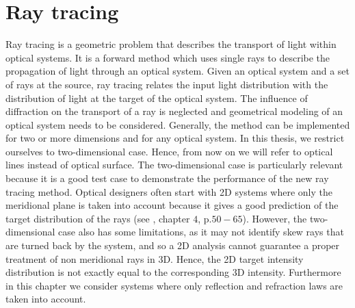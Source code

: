 \chapter{Ray tracing}\label{chap:raytracing}
Ray tracing is a geometric problem that describes the transport of light within optical systems.
It is a forward method which uses single rays to describe the propagation of light through an optical system.
Given an optical system and a set of rays at the source, ray tracing relates the input light distribution with the distribution of light at the target of the optical system. 
The influence of diffraction on the transport of a ray is neglected and geometrical modeling of an optical system needs to be considered.
Generally, the method can be implemented for two or more dimensions and for any optical system.
In this thesis, we restrict ourselves to two-dimensional case. Hence, from now on we will refer to optical lines instead of optical surface.
The two-dimensional case is particularly relevant because it is a good test case to demonstrate the performance of the new ray tracing method.
Optical designers often start with 2D systems where only the meridional plane is taken into account because it gives a good prediction of the target distribution of the rays
(see \cite{winston2005nonimaging}, chapter $4$, p.$50-65$). However, the two-dimensional case also has some limitations, as it may not identify skew rays that are turned back by the system, and so a 2D analysis cannot guarantee a proper treatment of non meridional rays in 3D. Hence, the 2D target intensity distribution is not exactly equal to the corresponding 3D intensity. Furthermore in this chapter we consider systems where only reflection and refraction laws are taken into account.
